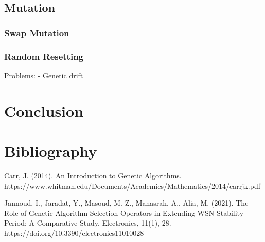 \documentclass{article}
\begin{document}
\bigskip
\subsection{Mutation}
\subsubsection{Swap Mutation}
\subsubsection{Random Resetting}
Problems:
- Genetic drift

\newpage
\section{Conclusion}

\newpage
\section{Bibliography}
Carr, J. (2014). An Introduction to Genetic Algorithms.\smallbreak
https://www.whitman.edu/Documents/Academics/Mathematics/2014/carrjk.pdf

Jannoud, I., Jaradat, Y., Masoud, M. Z., Manasrah, A., Alia, M. (2021). The Role of Genetic Algorithm Selection Operators in Extending WSN Stability Period: A Comparative Study. Electronics, 11(1), 28. https://doi.org/10.3390/electronics11010028‌
\end{document}
